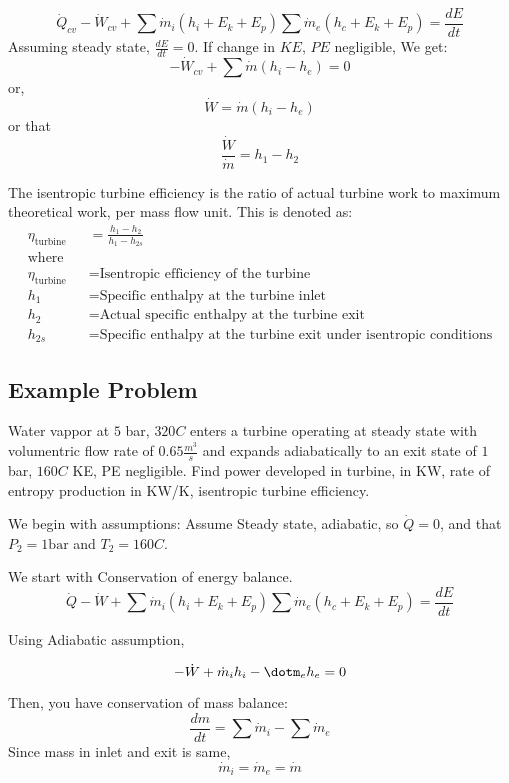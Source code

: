 \documentclass{article}
\begin{document}
\[\dot Q_{cv} - \dot W_{cv} + \sum \dot m_i (h_i + E_k + E_p)  \sum \dot m_e (h_c + E_k + E_p) = \frac{dE}{dt}\]
Assuming steady state, $\frac{dE}{dt} = 0$.
If change in $KE$, $PE$ negligible, 
We get:
\[- \dot W_{cv} + \sum \dot m (h_i - h_e) = 0\]
or, 
\[\dot W = \dot m(h_i - h_e)\]
or that
\[\frac{\dot W}{\dot m} = h_1 - h_2\]

\begin{definition}
    The isentropic turbine efficiency is the ratio of actual turbine work to maximum theoretical work, per mass flow unit. This is denoted as:
    \begin{align*}
\eta_{\text{turbine}} &= \frac{h_1 - h_2}{h_1 - h_{2s}} \\[5pt]
\text{where} \quad & \\
\eta_{\text{turbine}} & = \text{Isentropic efficiency of the turbine} \\
h_1 & = \text{Specific enthalpy at the turbine inlet} \\
h_2 & = \text{Actual specific enthalpy at the turbine exit} \\
h_{2s} & = \text{Specific enthalpy at the turbine exit under isentropic conditions}
\end{align*}

\end{definition}

\subsection{Example Problem}
\begin{proposition}
    Water vappor at $5$ bar, $320C$ enters a turbine operating at steady state with volumentric flow rate of $0.65 \frac{m^3}{s}$ and expands adiabatically to an exit state of $1$ bar, $160C$ KE, PE negligible. Find power developed in turbine, in KW, rate of entropy production in KW/K, isentropic turbine efficiency. 
\end{proposition}

We begin with assumptions: Assume Steady state, adiabatic, so $\dot Q = 0$, and that $P_2 = 1 \text{bar}$ and $T_2 = 160C$.

We start with Conservation of energy balance. 
\[\dot Q - \dot W + \sum \dot m_i (h_i + E_k + E_p)  \sum \dot m_e (h_c + E_k + E_p) = \frac{dE}{dt}\]

Using Adiabatic assumption, 

\[- \dot W + \dot m_ih_i - \dotm_eh_e = 0\]


Then, you have conservation of mass balance:
\[\frac{dm}{dt} = \sum \dot m_i - \sum \dot m_e\]
Since mass in inlet and exit is same, 
\[\dot m_i = \dot m_e = \dot m\]
\end{document}
